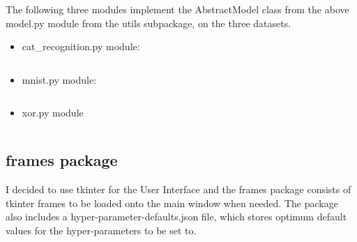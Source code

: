 \documentclass[./project-report/src/latex/project-report.tex]{subfiles}
\begin{document}
The following three modules implement the AbstractModel class from the above model.py module from the utils subpackage, on the three datasets.

\begin{itemize}
    \item cat\_recognition.py module:
        \inputminted{python}{./school_project/models/cpu/cat_recognition.py}
    \item mnist.py module:
        \inputminted{python}{./school_project/models/cpu/mnist.py}
    \item xor.py module
        \inputminted{python}{./school_project/models/cpu/xor.py}
\end{itemize}

\subsection{frames package}

I decided to use tkinter for the User Interface and the frames package consists of tkinter frames to be loaded onto the main window when needed. The package also 
includes a hyper-parameter-defaults.json file, which stores optimum default values for the hyper-parameters to be set to.
\end{document}
